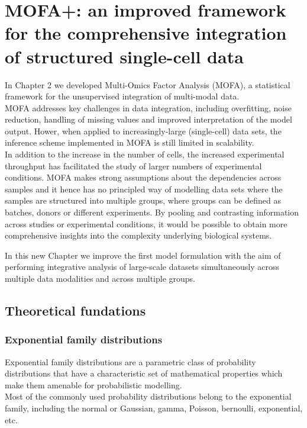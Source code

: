\graphicspath{{Chapter4/Figs/simulations/}{Chapter4/Figs/scrna/}{Chapter4/Figs/scmet/}{Chapter4/Figs/scnmt/}}

\chapter{MOFA+: an improved framework for the comprehensive integration of structured single-cell data}

In Chapter 2 we developed Multi-Omics Factor Analysis (MOFA), a statistical framework for the unsupervised integration of multi-modal data. \\
MOFA addresses key challenges in data integration, including overfitting, noise reduction, handling of missing values and improved interpretation of the model output. Hower, when applied to increasingly-large (single-cell) data sets, the inference scheme implemented in MOFA is still limited in scalability. \\
In addition to the increase in the number of cells, the increased experimental throughput has facilitated the study of larger numbers of experimental conditions. MOFA makes strong assumptions about the dependencies across samples and it hence has no principled way of modelling data sets where the samples are structured into multiple groups, where groups can be defined as batches, donors or different experiments. By pooling and contrasting information across studies or experimental conditions, it would be possible to obtain more comprehensive insights into the complexity underlying biological systems.

In this new Chapter we improve the first model formulation with the aim of performing integrative analysis of large-scale datasets simultaneously across multiple data modalities and across multiple groups.


\section{Theoretical fundations}

\subsection{Exponential family distributions} \label{section:exponential_family}

Exponential family distributions are a parametric class of probability distributions that have a characteristic set of mathematical properties which make them amenable for probabilistic modelling.\\
Most of the commonly used probability distributions belong to the exponential family, including the normal or Gaussian, gamma, Poisson, bernoulli, exponential, etc.

